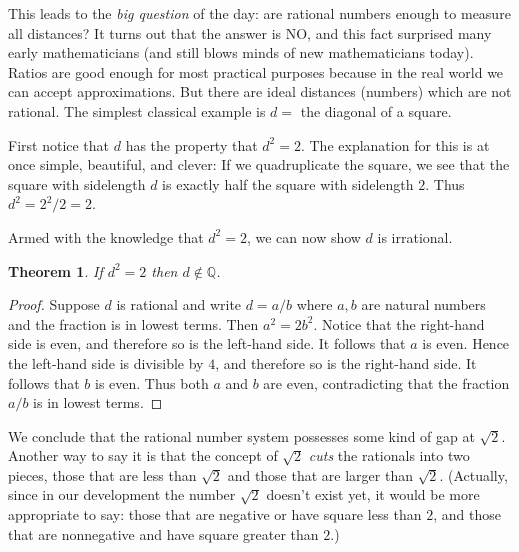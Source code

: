 \documentclass[11pt,oneside]{amsbook}
\newcommand{\Q}{\mathbb Q}
\theoremstyle{definition}
\theoremstyle{plain}
\newtheorem{theorem}{Theorem}[section]
\theoremstyle{definition}
\theoremstyle{remark}
\numberwithin{equation}{section}
\numberwithin{figure}{section}
\begin{document}
This leads to the \emph{big question} of the day: are rational numbers enough to measure all distances? It turns out that the answer is NO, and this fact surprised many early mathematicians (and still blows minds of new mathematicians today). Ratios are good enough for most practical purposes because in the real world we can accept approximations. But there are ideal distances (numbers) which are not rational. The simplest classical example is $d=$ the diagonal of a square.

First notice that $d$ has the property that $d^2=2$. The explanation for this is at once simple, beautiful, and clever: If we quadruplicate the square, we see that the square with sidelength $d$ is exactly half the square with sidelength $2$. Thus $d^2=2^2/2=2$.

\begin{center}
\quad
{}
\end{center}

Armed with the knowledge that $d^2=2$, we can now show $d$ is irrational.

\begin{theorem}
  \label{thm:root-2-irrational}
  If $d^2=2$ then $d\notin\Q$.
\end{theorem}

\begin{proof}
  Suppose $d$ is rational and write $d=a/b$ where $a,b$ are natural numbers and the fraction is in lowest terms. Then $a^2=2b^2$. Notice that the right-hand side is even, and therefore so is the left-hand side. It follows that $a$ is even. Hence the left-hand side is divisible by $4$, and therefore so is the right-hand side. It follows that $b$ is even. Thus both $a$ and $b$ are even, contradicting that the fraction $a/b$ is in lowest terms.
\end{proof}

We conclude that the rational number system possesses some kind of gap at $\sqrt2$. Another way to say it is that the concept of $\sqrt2$ \emph{cuts} the rationals into two pieces, those that are less than $\sqrt2$ and those that are larger than $\sqrt{2}$. (Actually, since in our development the number $\sqrt{2}$ doesn't exist yet, it would be more appropriate to say: those that are negative or have square less than $2$, and those that are nonnegative and have square greater than $2$.)
\end{document}
